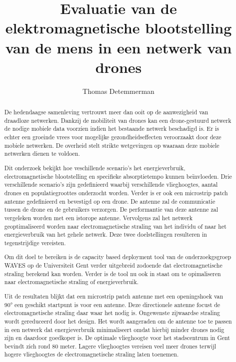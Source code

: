 \documentclass[twocolumn]{phdsymp_dutch}
\begin{document}
\title{	Evaluatie van de elektromagnetische blootstelling van de mens in een netwerk van drones}

\author{Thomas Detemmerman}


\maketitle

\begin{abstract}

  De hedendaagse samenleving vertrouwt meer dan ooit op de aanwezigheid van draadloze netwerken. 
  Dankzij de mobiliteit van  drones kan een drone-gestuurd netwerk de nodige mobiele data voorzien 
  indien het bestaande netwerk beschadigd is.
  Er is echter een groeinde vrees voor mogelijke gezondheidseffecten veroorzaakt door deze
  mobiele netwerken. De overheid stelt strikte wetgevingen op waaraan deze mobiele netwerken dienen te voldoen.
  
  Dit onderzoek bekijkt hoe veschillende scenario's het energieverbruik, electromagnetische blootstelling en 
  specifieke absorptietempo kunnen be\"invloeden.
  Drie verschillende scenario's zijn gedefinieerd waarbij verschillende vlieghoogtes, aantal drones en 
  populatiegroottes onderzocht worden.
  Verder is er ook een microstrip patch antenne gedefinieerd en bevestigd op een drone. 
  De antenne zal de communicatie tussen de drone en de gebruikers verzorgen.
  De performantie van deze antenne zal vergeleken worden met een istorope antenne.
  Vervolgens zal het netwerk geoptimaliseerd worden naar electromagnetische straling van het individu of 
  naar het energieverbruik van het gehele netwerk. Deze twee doelstellingen resulteren in 
  tegenstrijdige vereisten. 
  
  Om dit doel te bereiken is de capacity based deployment tool van de onderzoekgsgroep WAVES op de 
  Universiteit Gent verder uitgebreid zodoende dat electromagnetische straling berekend kan worden.
  Verder is de tool nu ook in staat om te opimaliseren naar electromagnetische straling of energieverbruik. 
  
  Uit de resultaten blijkt dat een microstrip patch antenne
  met een openingshoek van \ang{90} een geschikt startpunt is voor een antenne.
  Deze directionele  antenne focust de electromagnetische straling daar waar het nodig is.
  Ongewenste zijwaardse straling wordt gereduceerd door het design.
  Het wordt aangeraden om de antenne toe te passen in een netwerk dat energieverbruik minimaliseert
  omdat hierbij minder drones nodig zijn en daardoor goedkoper is.
  De optimale vlieghoogte voor het stadscentrum in Gent bevindt zich rond 80  meter.
  Lagere vlieghoogtes vereisen veel meer drones terwijl hogere vlieghoogtes de 
  electromagnetische straling laten toenemen.
  
\end{abstract}
\end{document}
